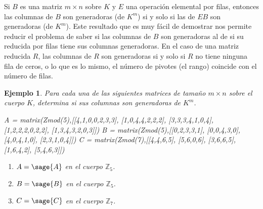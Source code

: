 \documentclass{amsart}
\newtheorem{ejem}{Ejemplo}
\begin{document}
Si $B$ es una matriz $m\times n$ sobre $K$ y $E$ una operación elemental 
por filas, entonces las columnas de $B$ son generadoras (de $K^m$) si y 
solo si las de $EB$ son generadoras (de $K^m$). Este resultado que es muy 
fácil de demostrar nos permite reducir el problema de saber si las columnas
de $B$ son generadoras al de si su reducida por filas tiene sus columnas
generadoras. En el caso de una matriz reducida $R$, las columnas de $R$
son generadoras si y solo si $R$ no tiene ninguna fila de ceros, o lo que
es lo mismo, el número de pivotes (el rango) coincide con el número de filas.

\begin{ejem}
Para cada una de las siguientes matrices de tamaño $m \times n$ sobre el
cuerpo $K$, determina si sus columnas son generadoras de $K^m$.

\begin{sagecode}
A = matrix(Zmod(5),[[4,1,0,0,2,3,3],
[1,0,4,4,2,2,2],
[3,3,3,4,1,0,4],
[1,2,2,2,0,2,2],
[1,3,4,3,2,0,3]])
B = matrix(Zmod(5),[[0,2,3,3,1],
[0,0,4,3,0],
[4,0,4,1,0],
[2,3,1,0,4]])
C = matrix(Zmod(7),[[4,4,6,5],
[5,6,0,6],
[3,6,6,5],
[1,6,4,2],
[5,4,6,3]])
\end{sagecode}

\begin{enumerate}
\item $A = \sage{A}$ en el cuerpo ${\mathbb Z}_5$.
\item $B = \sage{B}$ en el cuerpo ${\mathbb Z}_5$.
\item $C = \sage{C}$ en el cuerpo ${\mathbb Z}_7$.
\end{enumerate}
\end{ejem}
\end{document}
